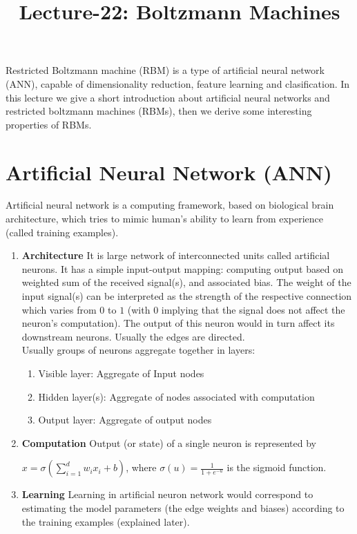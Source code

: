 \documentclass[letterpaper,10pt,english]{article}
\title{Lecture-22: Boltzmann Machines}
\author{}
\begin{document}
	

	
	
	
\maketitle
Restricted Boltzmann machine (RBM) is a type of artificial neural network (ANN), capable of dimensionality reduction, feature learning and clasification. In this lecture we give a short introduction about artificial neural networks and restricted boltzmann machines (RBMs), then we derive some interesting properties of RBMs.\\

\section{Artificial Neural Network (ANN)}
Artificial neural network is a computing framework, based on biological brain architecture, which tries to mimic human's ability to learn from experience (called training examples).\\
\begin{enumerate}
	\item \textbf{Architecture} It is large network of interconnected units called artificial neurons.
	It has a simple input-output mapping: computing output based on weighted sum of the received signal(s), and associated bias. The weight of the input signal(s) can be interpreted as the strength of the respective connection which varies from $0$ to $1$ (with $0$ implying that the signal does not affect the neuron's computation). The output of this neuron would in turn affect its downstream neurons. Usually the edges are directed.\\
	Usually groups of neurons aggregate together in layers: 
	\begin{enumerate}
		\item Visible layer: Aggregate of Input nodes
		\item Hidden layer(s):  Aggregate of nodes associated with computation
		\item Output layer:  Aggregate of output nodes
	\end{enumerate}
	\item \textbf{Computation} Output (or state) of a single neuron is represented by
	\begin{center} $ x =\sigma(\sum_{i=1}^d w_i x_i +b)$,
		where $\sigma(u)=\frac{1}{1+e^{-u}}$ is the sigmoid function.
	\end{center}
	\item \textbf{Learning} Learning in artificial neuron network would correspond to estimating the model parameters (the edge weights and biases) according to the training examples (explained later).
\end{enumerate}
\end{document}
